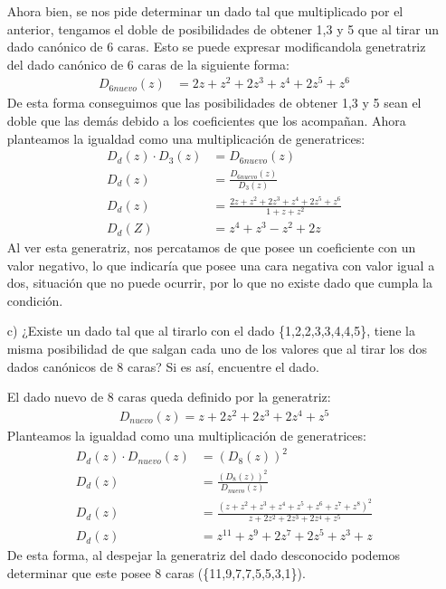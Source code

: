 \documentclass[spanish, fleqn]{article}
\begin{document}
\begin{itemize}
    Ahora bien, se nos pide determinar un dado tal que multiplicado por el anterior, tengamos el doble de posibilidades de obtener 1,3 y 5 que al tirar un dado canónico de 6 caras. Esto se puede expresar modificandola genetratriz del dado canónico de 6 caras de la siguiente forma:
    \begin{align*}
    D_{6nuevo}(z)&=2z+z^2+2z^3+z^4+2z^5+z^6
    \end{align*}
    De esta forma conseguimos que las posibilidades de obtener 1,3 y 5 sean el doble que las demás debido a los coeficientes que los acompañan.
    Ahora planteamos la igualdad como una multiplicación de generatrices:
    \begin{align*}
    D_d(z) \cdot D_3(z)&=D_{6nuevo}(z)\\
    D_d(z) &= \frac{D_{6nuevo}(z)}{D_3(z)}\\
    D_d(z)&= \frac{2z+z^2+2z^3+z^4+2z^5+z^6}{1+z+z^2}    \\
    D_d(Z)&=z^4+z^3-z^2+2z
    \end{align*}
    Al ver esta generatriz, nos percatamos de que posee un coeficiente con un valor negativo, lo que indicaría que posee una cara negativa con valor igual a dos, situación que no puede ocurrir, por lo que no existe dado que cumpla la condición.
    \item[c)] ¿Existe un dado tal que al tirarlo con el dado \{1,2,2,3,3,4,4,5\}, tiene la misma posibilidad de que salgan cada uno de los valores que al tirar los dos dados canónicos de 8 caras? Si es así, encuentre el dado.
    
    El dado nuevo de 8 caras queda definido por la generatriz:
    \begin{align*}
    D_{nuevo}(z)=z+2z^2+2z^3+2z^4+z^5
    \end{align*}
    Planteamos la igualdad como una multiplicación de generatrices:
    \begin{align*}
    D_d(z) \cdot D_{nuevo}(z)&=(D_8(z))^2\\
    D_d(z)&= \frac{(D_8(z))^2}{D_{nuevo}(z)}\\
    D_d(z)&=\frac{(z+z^2+z^3+z^4+z^5+z^6+z^7+z^8)^2}{z+2z^2+2z^3+2z^4+z^5}\\
    D_d(z)&=z^11+z^9+2z^7+2z^5+z^3+z
    \end{align*}
    De esta forma, al despejar la generatriz del dado desconocido podemos determinar que este posee 8 caras (\{11,9,7,7,5,5,3,1\}).
	\end{itemize}
\end{document}
